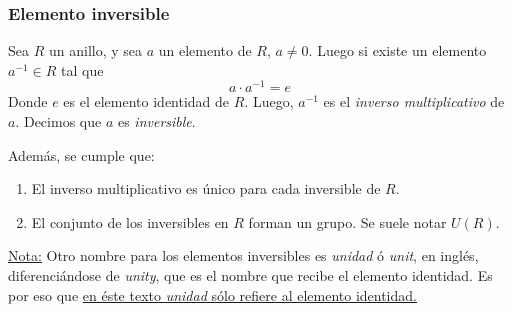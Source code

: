 \documentclass[../main.tex]{subfiles}
\begin{document}
{        \subsubsection{Elemento inversible} {
            Sea $R$ un anillo, y sea $a$ un elemento de $R$, $a \neq 0$. Luego si existe un elemento $a^{-1} \in R$ tal que
            \begin{equation*} { a \cdot a^{-1} = e} \end{equation*}
            Donde $e$ es el elemento identidad de $R$. \nln
            Luego, $a^{-1}$ es el \textit{inverso multiplicativo} de $a$. Decimos que $a$ es \textit{inversible}. 
            
            
            \nln Además, se cumple que:
            
            \begin{enumerate}
                \item El inverso multiplicativo es único para cada inversible de $R$.
                \item El conjunto de los inversibles en $R$ forman un grupo. Se suele notar $U(R)$.
            \end{enumerate}
            
            \nln
            \ul{Nota:} Otro nombre para los elementos inversibles es \textit{unidad} ó \textit{unit}, en inglés, diferenciándose de \textit{unity}, que es el nombre que recibe el elemento identidad. Es por eso que \ul{en éste texto \textit{unidad} sólo refiere al elemento identidad.}
            
        }
        
    } 

\newpage
\end{document}
